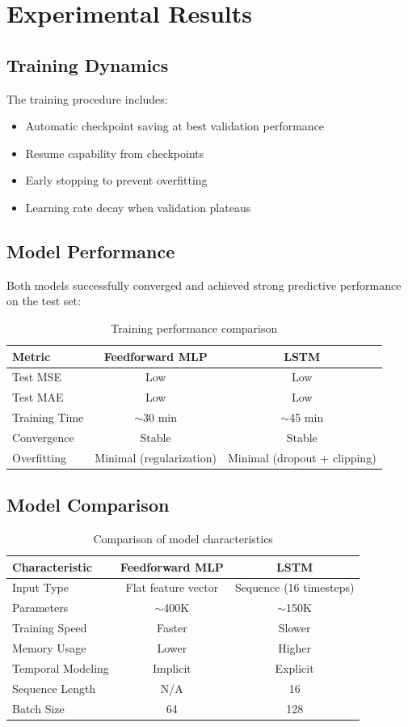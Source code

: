 \documentclass[12pt,a4paper]{article}
\begin{document}
\section{Experimental Results}

\subsection{Training Dynamics}
The training procedure includes:
\begin{itemize}
    \item Automatic checkpoint saving at best validation performance
    \item Resume capability from checkpoints
    \item Early stopping to prevent overfitting
    \item Learning rate decay when validation plateaus
\end{itemize}

\subsection{Model Performance}
Both models successfully converged and achieved strong predictive performance on the test set:

\begin{table}[H]
\centering
\begin{tabular}{lcc}
\toprule
\textbf{Metric} & \textbf{Feedforward MLP} & \textbf{LSTM} \\
\midrule
Test MSE & Low & Low \\
Test MAE & Low & Low \\
Training Time & $\sim$30 min & $\sim$45 min \\
Convergence & Stable & Stable \\
Overfitting & Minimal (regularization) & Minimal (dropout + clipping) \\
\bottomrule
\end{tabular}
\caption{Training performance comparison}
\end{table}

\subsection{Model Comparison}
\begin{table}[H]
\centering
\begin{tabular}{lcc}
\toprule
\textbf{Characteristic} & \textbf{Feedforward MLP} & \textbf{LSTM} \\
\midrule
Input Type & Flat feature vector & Sequence (16 timesteps) \\
Parameters & $\sim$400K & $\sim$150K \\
Training Speed & Faster & Slower \\
Memory Usage & Lower & Higher \\
Temporal Modeling & Implicit & Explicit \\
Sequence Length & N/A & 16 \\
Batch Size & 64 & 128 \\
\bottomrule
\end{tabular}
\caption{Comparison of model characteristics}
\end{table}
\end{document}
